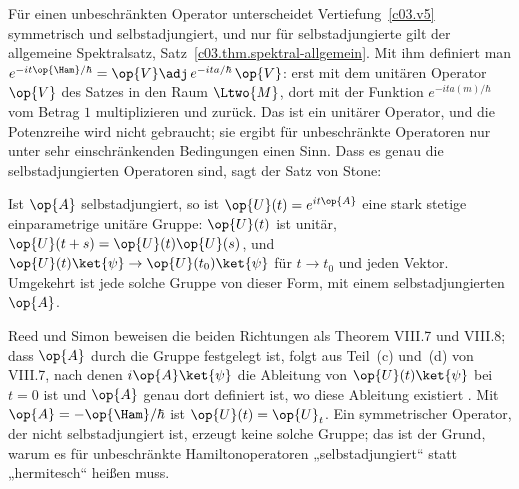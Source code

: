 \begin{vertiefung}[id=c04.v2,
    titel={Unbeschränkte Hamiltonoperatoren},
    wozu={Im Kern ist $\op{\Ham}$ eine hermitesche Matrix, und $e^{-it\op{\Ham}/\hbar}$ ist eine Summe
      über die Eigenvektoren. Die wichtigsten Hamiltonoperatoren sind aber unbeschränkt. Hier steht,
      warum dann „hermitesch“ nicht mehr reicht und was an seine Stelle tritt.},
    voraussetzung={Abschnitt~\ref{c04.s2}; Vertiefungen~\ref{c03.v5} und~\ref{c03.v7} (symmetrisch
      und selbstadjungiert, Spektralsatz). Der Kern braucht den Block nicht; Kapitel~5 und~9 nehmen
      das Thema wieder auf.},
    zurueck={Für einen unbeschränkten Hamiltonoperator muss es heißen: selbstadjungiert. Genau die
      selbstadjungierten Operatoren erzeugen unitäre Zeitentwicklungen.}]
  Für einen unbeschränkten Operator unterscheidet Vertiefung~\ref{c03.v5} symmetrisch und
  selbstadjungiert, und nur für selbstadjungierte gilt der allgemeine Spektralsatz,
  Satz~\ref{c03.thm.spektral-allgemein}. Mit ihm definiert man
  $e^{-it\op{\Ham}/\hbar} = \op{V}\adj\, e^{-ita/\hbar}\, \op{V}$: erst mit dem unitären Operator $\op{V}$
  des Satzes in den Raum $\Ltwo{M}$, dort mit der Funktion $e^{-ita(m)/\hbar}$ vom Betrag $1$
  multiplizieren und zurück. Das ist ein unitärer Operator, und die Potenzreihe wird nicht
  gebraucht; sie ergibt für unbeschränkte Operatoren nur unter sehr einschränkenden Bedingungen
  einen Sinn. Dass es genau die selbstadjungierten Operatoren sind, sagt der Satz von Stone:

  \begin{theorem}[Stone]\label{c04.thm.stone}
    Ist $\op{A}$ selbstadjungiert, so ist $\op{U}(t) = e^{it\op{A}}$ eine stark stetige
    einparametrige unitäre Gruppe: $\op{U}(t)$ ist unitär, $\op{U}(t+s) = \op{U}(t)\op{U}(s)$, und
    $\op{U}(t)\ket{\psi} \to \op{U}(t_0)\ket{\psi}$ für $t \to t_0$ und jeden Vektor. Umgekehrt ist jede
    solche Gruppe von dieser Form, mit einem selbstadjungierten $\op{A}$.
  \end{theorem}

  Reed und Simon beweisen die beiden Richtungen als Theorem VIII.7 und VIII.8; dass $\op{A}$ durch
  die Gruppe festgelegt ist, folgt aus Teil~(c) und~(d) von VIII.7, nach denen $i\op{A}\ket{\psi}$ die
  Ableitung von $\op{U}(t)\ket{\psi}$ bei $t = 0$ ist und $\op{A}$ genau dort definiert ist, wo diese
  Ableitung existiert
  . Mit $\op{A} = -\op{\Ham}/\hbar$ ist $\op{U}(t) = \op{U}_t$. Ein
  symmetrischer Operator, der nicht selbstadjungiert ist, erzeugt keine solche Gruppe; das ist der
  Grund, warum es für unbeschränkte Hamiltonoperatoren „selbstadjungiert“ statt „hermitesch“
  heißen muss.
\end{vertiefung}

